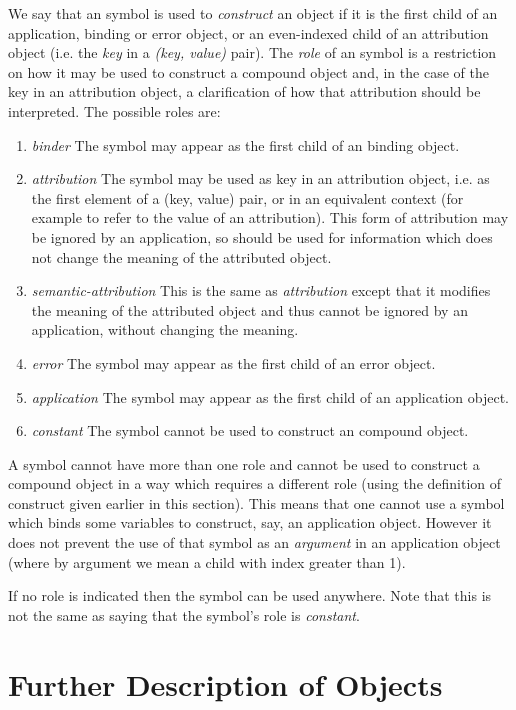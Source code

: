 We say that an \OM symbol is used to \emph{construct}
an \OM object if it is the first child of an \OM application,
binding or error object, or an even-indexed child of an \OM
attribution object (i.e. the \emph{key} in a
\emph{(key, value)} pair).
The \emph{role} of an \OM symbol is a restriction
on how it may be used to construct a compound \OM object and, in the
case of the key in an attribution object, a clarification of how that
attribution should be interpreted.  The possible roles are:
\begin{enumerate}[(\em i\rm)]
\item \emph{binder} The symbol may appear as the first child of an \OM binding object.
\item \emph{attribution} The symbol may be used as key in an \OM attribution object,
  i.e. as the first element of a (key, value) pair, or in an equivalent context (for
  example to refer to the value of an attribution).  This form of attribution may be
  ignored by an application, so should be used for information which does not change the
  meaning of the attributed \OM object.
\item \emph{semantic-attribution} This is the same as \emph{attribution} except that it
  modifies the meaning of the attributed \OM object and thus cannot be ignored by an
  application, without changing the meaning.
\item \emph{error} The symbol may appear as the first child of an \OM error object.
\item \emph{application} The symbol may appear as the first child of an \OM application
  object.
\item \emph{constant} The symbol cannot be used to construct an \OM compound object.
\end{enumerate}
A symbol cannot have more than one role and cannot be used to construct a compound \OM
object in a way which requires a different role (using the definition of construct given
earlier in this section).  This means that one cannot use a symbol which binds some
variables to construct, say, an application object.  However it does not prevent the use
of that symbol as an \emph{argument} in an application object (where by argument we mean a
child with index greater than 1).
 
If no role is indicated then the symbol can be used anywhere.  Note that this is not the
same as saying that the symbol's role is \emph{constant}.

\section{Further Description of \OM Objects}\label{sec_omin}

